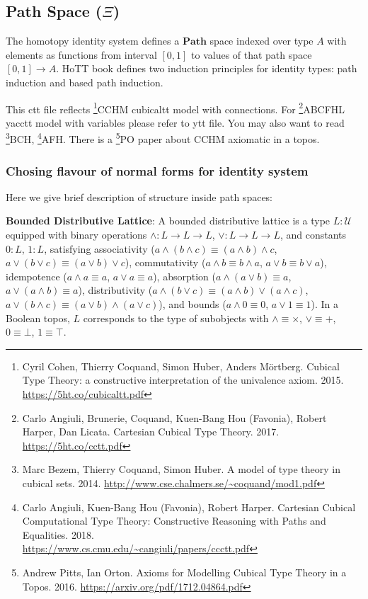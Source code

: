 \documentclass{article}
\begin{document}
\subsection{Path Space ($\Xi$)}

The homotopy identity system defines a $\mathbf{Path}$ space indexed over type $A$
with elements as functions from interval $[0,1]$ to values
of that path space $[0,1] \rightarrow A$. HoTT book
defines two induction principles for identity types:
path induction and based path induction.

This ctt file reflects \footnote{Cyril Cohen, Thierry Coquand, Simon Huber, Anders M{\"{o}}rtberg. Cubical Type Theory: a constructive interpretation of the univalence axiom. 2015. \url{https://5ht.co/cubicaltt.pdf}}{CCHM} cubicaltt model with connections.
For \footnote{Carlo Angiuli, Brunerie, Coquand, Kuen-Bang Hou (Favonia), Robert Harper, Dan Licata. Cartesian Cubical Type Theory. 2017. \url{https://5ht.co/cctt.pdf}}{ABCFHL} yacctt model with
variables please refer to ytt file. You may also want to
read \footnote{Marc Bezem, Thierry Coquand, Simon Huber. A model of type theory in cubical sets. 2014. \url{http://www.cse.chalmers.se/~coquand/mod1.pdf}}{BCH},
\footnote{Carlo Angiuli, Kuen-Bang Hou (Favonia), Robert Harper. Cartesian Cubical Computational Type Theory: Constructive Reasoning with Paths and Equalities. 2018. \\ \url{https://www.cs.cmu.edu/~cangiuli/papers/ccctt.pdf}}{AFH}.
There is a \footnote{Andrew Pitts, Ian Orton. Axioms for Modelling Cubical Type Theory in a Topos. 2016. \url{https://arxiv.org/pdf/1712.04864.pdf}}{PO} paper about CCHM axiomatic in a topos.

\subsubsection*{Chosing flavour of normal forms for identity system}

Here we give brief description of structure inside path spaces:

\textbf{Bounded Distributive Lattice}: A bounded distributive lattice is a type $L : \mathcal{U}$ equipped with binary operations $\wedge : L \to L \to L$, $\vee : L \to L \to L$, and constants $0 : L$, $1 : L$, satisfying associativity ($a \wedge (b \wedge c) \equiv (a \wedge b) \wedge c$, $a \vee (b \vee c) \equiv (a \vee b) \vee c$), commutativity ($a \wedge b \equiv b \wedge a$, $a \vee b \equiv b \vee a$), idempotence ($a \wedge a \equiv a$, $a \vee a \equiv a$), absorption ($a \wedge (a \vee b) \equiv a$, $a \vee (a \wedge b) \equiv a$), distributivity ($a \wedge (b \vee c) \equiv (a \wedge b) \vee (a \wedge c)$, $a \vee (b \wedge c) \equiv (a \vee b) \wedge (a \vee c)$), and bounds ($a \wedge 0 \equiv 0$, $a \vee 1 \equiv 1$). In a Boolean topos, $L$ corresponds to the type of subobjects with $\wedge \equiv \times$, $\vee \equiv +$, $0 \equiv \bot$, $1 \equiv \top$.
\end{document}
